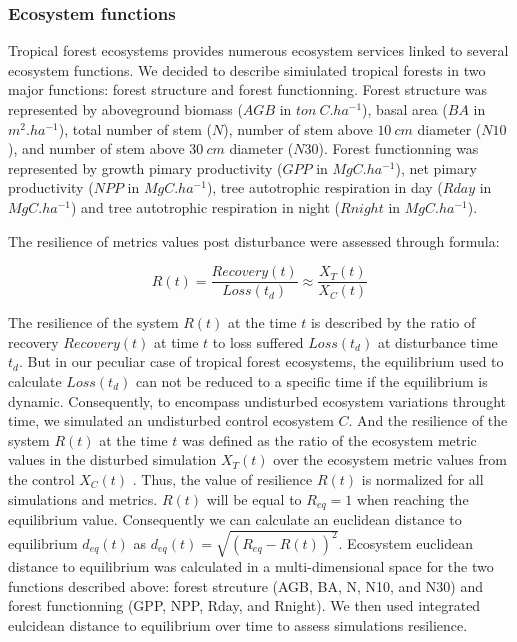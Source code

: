 \documentclass[12pt,]{article}
\theoremstyle{definition}
\theoremstyle{definition}
\theoremstyle{remark}
\begin{document}
\subsubsection{Ecosystem functions}\label{ecosystem-functions}

Tropical forest ecosystems provides numerous ecosystem services linked
to several ecosystem functions. We decided to describe simiulated
tropical forests in two major functions: forest structure and forest
functionning. Forest structure was represented by aboveground biomass
(\(AGB\) in \(ton~C.ha^{-1}\)), basal area (\(BA\) in \(m^2.ha^{-1}\)),
total number of stem (\(N\)), number of stem above \(10~cm\) diameter
(\(N10\)), and number of stem above \(30~cm\) diameter (\(N30\)). Forest
functionning was represented by growth pimary productivity (\(GPP\) in
\(MgC.ha^{-1}\)), net pimary productivity (\(NPP\) in \(MgC.ha^{-1}\)),
tree autotrophic respiration in day (\(Rday\) in \(MgC.ha^{-1}\)) and
tree autotrophic respiration in night (\(Rnight\) in \(MgC.ha^{-1}\)).

The resilience of metrics values post disturbance were assessed through
\citet{Henry2012} formula:

\begin{equation}
  R\left(t\right)=\frac{Recovery\left(t\right)}{Loss\left(t_d\right)} \approx \frac{X_T(t)}{X_C(t)}
  \label{eq:Resilience}
\end{equation}

The resilience of the system \(R(t)\) at the time \(t\) is described by
the ratio of recovery \(Recovery(t)\) at time \(t\) to loss suffered
\(Loss(t_d)\) at disturbance time \(t_d\). But in our peculiar case of
tropical forest ecosystems, the equilibrium used to calculate
\(Loss(t_d)\) can not be reduced to a specific time if the equilibrium
is dynamic. Consequently, to encompass undisturbed ecosystem variations
throught time, we simulated an undisturbed control ecosystem \(C\). And
the resilience of the system \(R(t)\) at the time \(t\) was defined as
the ratio of the ecosystem metric values in the disturbed simulation
\(X_T(t)\) over the ecosystem metric values from the control \(X_C(t)\)
. Thus, the value of resilience \(R(t)\) is normalized for all
simulations and metrics. \(R(t)\) will be equal to \(R_{eq} = 1\) when
reaching the equilibrium value. Consequently we can calculate an
euclidean distance to equilibrium \(d_{eq}(t)\) as
\(d_{eq}(t) = \sqrt{(R_{eq} - R(t))^2}\). Ecosystem euclidean distance
to equilibrium was calculated in a multi-dimensional space for the two
functions described above: forest strcuture (AGB, BA, N, N10, and N30)
and forest functionning (GPP, NPP, Rday, and Rnight). We then used
integrated eulcidean distance to equilibrium over time to assess
simulations resilience.
\end{document}
